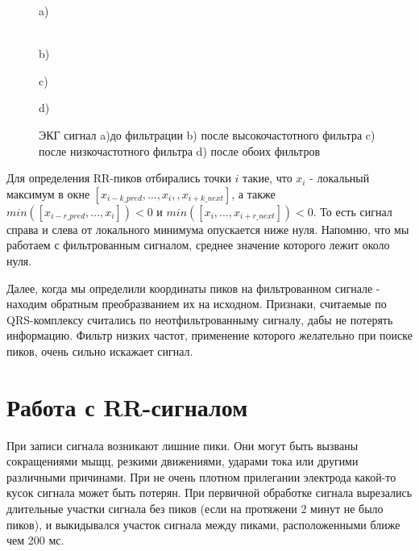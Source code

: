 \begin{figure}[h]
	\begin{minipage}[h]{0.47\linewidth}
		 a) \\
	\end{minipage}
	\hfill
	\begin{minipage}[h]{0.47\linewidth}
		 \\b)
	\end{minipage}
	\vfill
	\begin{minipage}[h]{0.47\linewidth}
		 c) \\
	\end{minipage}
	\hfill
	\begin{minipage}[h]{0.47\linewidth}
		 d) \\
	\end{minipage}
	\caption{ЭКГ сигнал a)до фильтрации b) после высокочастотного фильтра
		c) после низкочастотного фильтра d) после обоих фильтров}
	\label{ris:filter_ekg}
\end{figure}

Для определения RR-пиков отбирались точки $i$ такие, что $x_i$ - локальный максимум в окне $[x_{i-k\_pred}, ..., x_i,    , x_{i+k\_next}]$, а также $min([x_{i-r\_pred}, ..., x_i])<0$ и $min([x_i, ..., x_{i+r\_next}])<0$. То есть сигнал справа и слева от локального минимума опускается ниже нуля. Напомню, что мы работаем с фильтрованным сигналом, среднее значение которого лежит около нуля.

Далее, когда мы определили координаты пиков на фильтрованном сигнале - находим обратным преобразванием их на исходном. Признаки, считаемые по QRS-комплексу считались по неотфильтрованныму сигналу, дабы не потерять информацию. Фильтр низких частот, применение которого желательно при поиске пиков, очень сильно искажает сигнал. 

\section{Работа с RR-сигналом}
При записи сигнала возникают лишние пики. Они могут быть вызваны сокращениями мыщц, резкими движениями, ударами тока или другими различными причинами. При не очень плотном прилегании электрода какой-то кусок сигнала может быть потерян. При первичной обработке сигнала вырезались длительные участки сигнала без пиков (если на протяжени 2 минут не было пиков), и выкидывался участок сигнала между пиками, расположенными ближе чем 200 мс.



